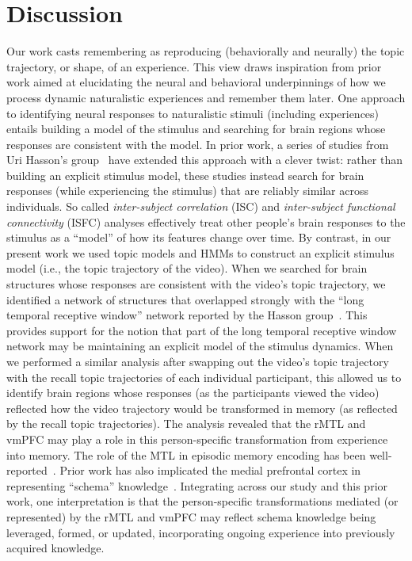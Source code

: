 \documentclass{article}
\begin{document}
\section*{Discussion}
\label{sec:discussion}

Our work casts remembering as reproducing (behaviorally and neurally) the topic trajectory, or shape, of an experience.  This view draws inspiration from prior work aimed at elucidating the neural and behavioral underpinnings of how we process dynamic naturalistic experiences and remember them later.  One approach to identifying neural responses to naturalistic stimuli (including experiences) entails building a model of the stimulus and searching for brain regions whose responses are consistent with the model.  In prior work, a series of studies from Uri Hasson's group~\citep{LernEtal11, SimoEtal16, ChenEtal17, BaldEtal17, ZadbEtal17} have extended this approach with a clever twist: rather than building an explicit stimulus model, these studies instead search for brain responses (while experiencing the stimulus) that are reliably similar across individuals.  So called \textit{inter-subject correlation} (ISC) and \textit{inter-subject functional connectivity} (ISFC) analyses effectively treat other people's brain responses to the stimulus as a ``model'' of how its features change over time.  By contrast, in our present work we used topic models and HMMs to construct an explicit stimulus model (i.e., the topic trajectory of the video).  When we searched for brain structures whose responses are consistent with the video's topic trajectory, we identified a network of structures that overlapped strongly with the ``long temporal receptive window'' network reported by the Hasson group~\citep[e.g., compare our Fig.~\ref{fig:brainz}A with the map of long temporal receptive window voxels in][]{LernEtal11}.  This provides support for the notion that part of the long temporal receptive window network may be maintaining an explicit model of the stimulus dynamics.  When we performed a similar analysis after swapping out the video's topic trajectory with the recall topic trajectories of each individual participant, this allowed us to identify brain regions whose responses (as the participants viewed the video) reflected how the video trajectory would be transformed in memory (as reflected by the recall topic trajectories).  The analysis revealed that the rMTL and vmPFC may play a role in this person-specific transformation from experience into memory.  The role of the MTL in episodic memory encoding has been well-reported~\citep[e.g., ][]{PallWagn02, DavaEtAl03, RangEtal04a, Dava06, WiltSilv07, DianEtal07, KestEtal13}.  Prior work has also implicated the medial prefrontal cortex in representing ``schema'' knowledge~\citep[i.e., general knowledge about the format of an ongoing experience given prior similar experiences; ][]{KestEtal12, KestEtal13, SchlPres15, GilbMarl17, SpalEtal18}.  Integrating across our study and this prior work, one interpretation is that the person-specific transformations mediated (or represented) by the rMTL and vmPFC may reflect schema knowledge being leveraged, formed, or updated, incorporating ongoing experience into previously acquired knowledge.
\end{document}
